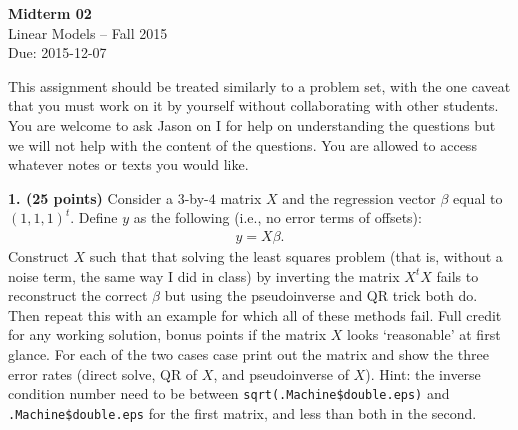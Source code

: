 \documentclass[12pt]{article}
\begin{document}
\begin{center}
{\bf Midterm 02} \\
Linear Models -- Fall 2015 \\
Due: 2015-12-07
\end{center}

\medskip

This assignment should be treated similarly to a problem set, with the one
caveat that you must work on it by yourself without collaborating with other
students. You are welcome to ask Jason on I for help on understanding the
questions but we will not help with the content of the questions. You are allowed
to access whatever notes or texts you would like.

{\bf 1. (25 points)} Consider a $3$-by-$4$ matrix $X$ and the
regression vector $\beta$ equal to $(1, 1, 1)^t$. Define $y$ as the following (i.e., no
error terms of offsets):
\begin{align*}
y = X \beta.
\end{align*}
Construct $X$ such that that solving the least squares
problem (that is, without a noise term, the same way I did in class) by inverting
the matrix $X^t X$ fails to reconstruct the correct $\beta$ but using the pseudoinverse
and QR trick both do. Then repeat this with an example for which all of these methods fail.
Full credit for any working solution, bonus points if the matrix $X$ looks
`reasonable' at first glance. For each of the two cases case print out the matrix and show
the three error rates (direct solve, QR of $X$, and pseudoinverse of $X$). Hint: the inverse
condition number need to be between \texttt{sqrt(.Machine\$double.eps)} and
\texttt{.Machine\$double.eps} for the first matrix, and less than both in the second.

\end{document}
